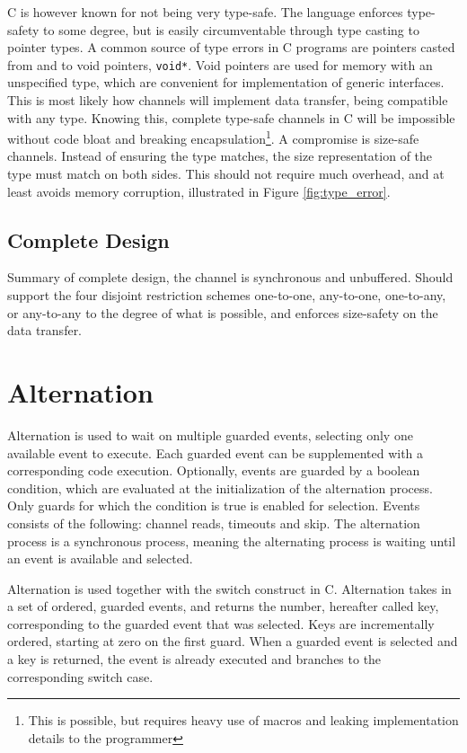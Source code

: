 C is however known for not being very type\hyp{}safe. The language enforces type\hyp{}safety to some degree, but is easily circumventable through type casting to pointer types. A common source of type errors in C programs are pointers casted from and to void pointers, \texttt{void*}. Void pointers are used for memory with an unspecified type, which are convenient for implementation of generic interfaces. This is most likely how channels will implement data transfer, being compatible with any type. Knowing this, complete type\hyp{}safe channels in C will be impossible without code bloat and breaking encapsulation\footnote{This is possible, but requires heavy use of macros and leaking implementation details to the programmer}. A compromise is size\hyp{}safe channels. Instead of ensuring the type matches, the size representation of the type must match on both sides. This should not require much overhead, and at least avoids memory corruption, illustrated in Figure \ref{fig:type_error}.

\subsection{Complete Design}

Summary of complete design, the channel is synchronous and unbuffered. Should support the four disjoint restriction schemes one\hyp{}to\hyp{}one, any\hyp{}to\hyp{}one, one\hyp{}to\hyp{}any, or any\hyp{}to\hyp{}any to the degree of what is possible, and enforces size\hyp{}safety on the data transfer.


\section{Alternation}
\label{sec:alternation}

Alternation is used to wait on multiple guarded events, selecting only one available event to execute. Each guarded event can be supplemented with a corresponding code execution. Optionally, events are guarded by a boolean condition, which are evaluated at the initialization of the alternation process. Only guards for which the condition is true is enabled for selection. Events consists of the following: channel reads, timeouts and skip. The alternation process is a synchronous process, meaning the alternating process is waiting until an event is available and selected. 

Alternation is used together with the switch construct in C. Alternation takes in a set of ordered, guarded events, and returns the number, hereafter called key, corresponding to the guarded event that was selected. Keys are incrementally ordered, starting at zero on the first guard. When a guarded event is selected and a key is returned, the event is already executed and branches to the corresponding switch case. 

